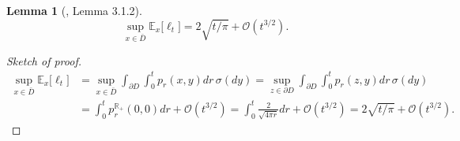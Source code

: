 \documentclass[a4paper,12pt]{article}
\theoremstyle{plain}
\newtheorem{lemma}[thm]{Lemma}
\def\R{{\mathbb R}}
\def\R{{\mathbb R}}%
\begin{document}
\begin{lemma}[{\cite{Wang-Book}, Lemma 3.1.2}]\label{l2}
\begin{equation}
\sup_{x\in \bar D} \mathbb E_x\big[ \ell_t\big]=2 \sqrt{t/\pi} + {\mathcal O}(t^{3/2}).
\end{equation}
\end{lemma}

\begin{proof}[Sketch of proof]
\begin{align*}
\sup_{x\in \bar D} \mathbb E_x\big[ \ell_t\big]&= \sup_{x\in \bar D}\int_{\partial D} \int_0^t p_r(x,y)dr\,\sigma(dy)
=
 \sup_{z\in \partial D}\int_{\partial D} \int_0^t p_r(z,y)dr\,\sigma(dy)\\&
=  \int_0^t p^{\R_+}_r(0,0)dr+ {\mathcal O}(t^{3/2})=\int_0^t\frac2{\sqrt{4\pi r}}dr+ {\mathcal O}(t^{3/2})=
2 \sqrt{t/\pi} + {\mathcal O}(t^{3/2}).
\end{align*}

\end{proof}
 
\end{document}

